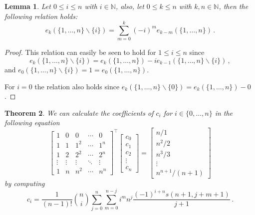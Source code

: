 \documentclass{article}
\newtheorem{theorem}{Theorem}
\newtheorem{lemma}[theorem]{Lemma}
\newcommand{\setminusD}{\mathbin{\backslash}}
\begin{document}
\begin{lemma}
\label{lemma:missing}
Let $0 \leq i \leq n$ with $i \in \mathbb N$, also, let $0 \leq k \leq n$ with $k,n \in \mathbb N$, then the following relation holds:
\begin{equation}
    e_{k} ( \{ 1, \dots, n \} \setminusD \{ i \}) = \sum_{m=0}^{k} (-i)^m e_{k-m}(\{ 1, \dots, n \}) \,. \nonumber
\end{equation}
\end{lemma}
\begin{proof}
This relation can easily be seen to hold for $1 \leq i \leq n$ since
\begin{equation}
    e_{k} ( \{ 1, \dots, n \} \setminusD \{ i \}) = e_{k} ( \{ 1, \dots, n \}) - i e_{k-1} ( \{ 1, \dots, n \} \setminusD \{ i \}) \,, \nonumber
\end{equation}
and $e_0(\{ 1, \dots, n \} \setminusD \{ i \}) = 1 = e_0(\{ 1, \dots, n \})$.

For $i=0$ the relation also holds since $e_k(\{ 1, \dots, n \} \setminusD \{ 0 \}) = e_k(\{ 1, \dots, n \}) - 0$.
\end{proof}


\begin{theorem}
\label{theorem:calc}
We can calculate the coefficients of $c_i$ for $i \in \{ 0, \dots, n \}$ in the following equation
\begin{equation}
    \begin{bmatrix}
        1&0&0&\cdots&0 \\
        1&1&1^2&\cdots&1^n \\
        1&2&2^2&\cdots&2^n \\
        \vdots&\vdots & \vdots & \ddots & \vdots\\
        1&n&n^2&\cdots&n^n
    \end{bmatrix}^\top
    \begin{bmatrix}
        c_0 \\
        c_1 \\
        c_2 \\
        \vdots \\
        c_n
    \end{bmatrix}
    =
    \begin{bmatrix}
        n/1\\
        n^2/2\\
        n^3/3\\
        \vdots \\
        n^{n+1}/(n+1)
    \end{bmatrix} \label{eq:vander}
\end{equation}
by computing
\begin{equation}
    c_i =
        \frac{1}{(n-1)!} \binom{n}{i} \sum_{j=0}^{n} \sum_{m=0}^{n-j} i^m n^{j} \frac{(-1)^{i+n} s(n+1, j+m+1) }{j+1} \,. \nonumber
\end{equation}
\end{theorem}
\end{document}

